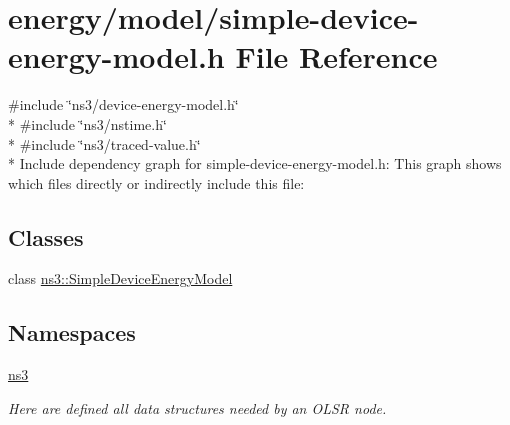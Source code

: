 \hypertarget{simple-device-energy-model_8h}{}\section{energy/model/simple-\/device-\/energy-\/model.h File Reference}
\label{simple-device-energy-model_8h}
{\ttfamily \#include \char`\"{}ns3/device-\/energy-\/model.\+h\char`\"{}}\\*
{\ttfamily \#include \char`\"{}ns3/nstime.\+h\char`\"{}}\\*
{\ttfamily \#include \char`\"{}ns3/traced-\/value.\+h\char`\"{}}\\*
Include dependency graph for simple-\/device-\/energy-\/model.h\+:
This graph shows which files directly or indirectly include this file\+:
\subsection*{Classes}
\begin{DoxyCompactItemize}
\item 
class \hyperlink{classns3_1_1SimpleDeviceEnergyModel}{ns3\+::\+Simple\+Device\+Energy\+Model}
\end{DoxyCompactItemize}
\subsection*{Namespaces}
\begin{DoxyCompactItemize}
\item 
 \hyperlink{namespacens3}{ns3}
\begin{DoxyCompactList}\small\item\em Here are defined all data structures needed by an O\+L\+SR node. \end{DoxyCompactList}\end{DoxyCompactItemize}
